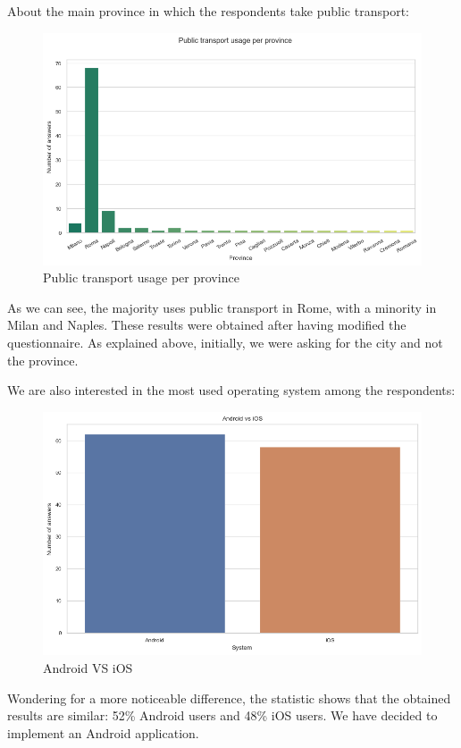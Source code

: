 \documentclass[a4paper, 11pt]{report}
\begin{document}
About the main province in which the respondents take public transport:

\begin{figure}[H]
	\centering
	\includegraphics[width=.8\textwidth]{img/analysis/public_transport_usage_per_province.png}
	\caption{Public transport usage per province}
\end{figure}

As we can see, the majority uses public transport in Rome, with a minority in Milan and Naples. These results were obtained after having modified
the questionnaire. As explained above, initially, we were asking for the city and not the province.


We are also interested in the most used operating system among the respondents:
\begin{figure}[H]
	\centering
	\includegraphics[width=.5\textwidth]{img/analysis/android_v_ios.png}
	\caption{Android VS iOS}
\end{figure}

Wondering for a more noticeable difference, the statistic shows that the obtained results are similar: 52\% Android users and 48\% iOS users.
We have decided to implement an Android application.
\end{document}
